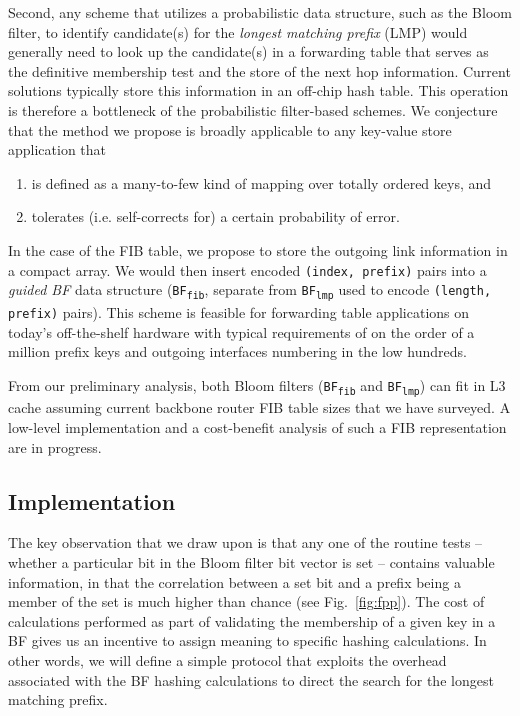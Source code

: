 \documentclass[conference,compsoc]{IEEEtran}
\begin{document}
Second, any scheme that utilizes a probabilistic data structure, such as
the Bloom filter, to identify candidate(s) for the \emph{longest matching
prefix} (LMP) would generally need to look up the candidate(s)
in a forwarding table that serves as the definitive membership
test and the store of the next hop information. Current solutions typically
store this information in an off-chip hash table. This operation is therefore
a bottleneck of the probabilistic filter-based schemes. We conjecture that
the method we propose is broadly applicable to any key-value store
application that

\begin{enumerate}[label=(\alph*)]
\item is defined as a many-to-few kind of mapping over totally ordered keys, and
\item tolerates (i.e. self-corrects for) a certain probability of error.
\end{enumerate}

In the case of the FIB table, we propose to store the outgoing link information
in a compact array. We would then insert encoded \texttt{(index, prefix)} pairs
into a \emph{guided BF} data structure (\texttt{BF\textsubscript{fib}}, 
separate from \texttt{BF\textsubscript{lmp}} used to
encode \texttt{(length, prefix)} pairs). This scheme is feasible for
forwarding table applications on today's off-the-shelf hardware with typical
requirements of on the order of a million prefix keys and outgoing
interfaces numbering in the low hundreds.

From our preliminary analysis, both Bloom filters (\texttt{BF\textsubscript{fib}}
and \texttt{BF\textsubscript{lmp}}) can fit in L3 cache assuming
current backbone router FIB table sizes that we have
surveyed.\cite{Yegorov:github} A low-level implementation and a cost-benefit
analysis of such a FIB representation are in progress.


\subsection{Implementation}

The key observation that we draw upon is that any one of the routine
tests -- whether a particular bit in the Bloom filter bit vector
is set -- contains valuable information, in that the correlation between
a set bit and a prefix being a member of the set is much higher than chance
(see Fig.~\ref{fig:fpp}). The cost of calculations performed as part of
validating the membership of a given key in a BF gives us an incentive to
assign meaning to specific hashing calculations. In other words, we will 
define a simple protocol that exploits the overhead associated with the
BF hashing calculations to direct the search for the longest matching prefix.
\end{document}
